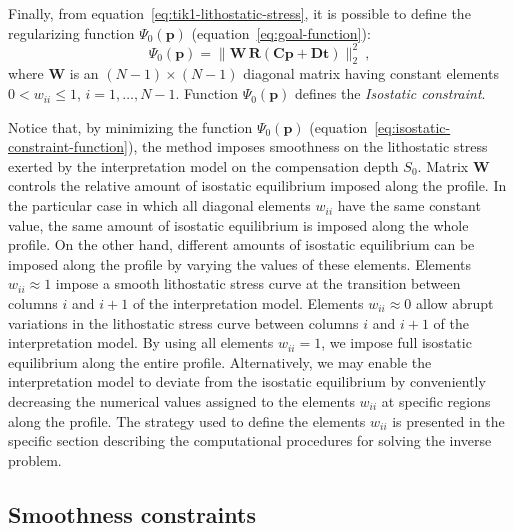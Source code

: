 \documentclass[manuscript,revised]{geophysics}
\begin{document}
Finally, from equation~\ref{eq:tik1-lithostatic-stress}, it is possible to
define the regularizing function $\Psi_{0}(\mathbf{p})$ 
(equation~\ref{eq:goal-function}): 
\begin{equation}
\Psi_{0}(\mathbf{p}) = \| \mathbf{W} \, \mathbf{R} \left( \mathbf{C} \mathbf{p} + \mathbf{D}
\mathbf{t} \right) \|_{2}^{2} \: ,
\label{eq:isostatic-constraint-function}
\end{equation}
where $\mathbf{W}$ is an $(N - 1) \times (N - 1)$ diagonal matrix having constant
elements $0 < w_{ii} \le 1$, $i = 1, \dots, N - 1$. 
Function $\Psi_{0}(\mathbf{p})$ defines the \textit{Isostatic constraint}.

Notice that, by minimizing the function $\Psi_{0}(\mathbf{p})$ 
(equation~\ref{eq:isostatic-constraint-function}), the method imposes smoothness on 
the lithostatic stress exerted by the interpretation model on the 
compensation depth $S_{0}$.
Matrix $\mathbf{W}$ controls the relative amount of isostatic equilibrium imposed 
along the profile. 
In the particular case in which all diagonal elements $w_{ii}$ have the same
constant value, the same amount of isostatic equilibrium is imposed along the 
whole profile. On the other hand, different amounts of isostatic equilibrium
can be imposed along the profile by varying the values of these elements.
Elements $w_{ii} \approx 1$ impose a smooth lithostatic stress curve 
at the transition between columns $i$ and $i+1$ of the interpretation model.
Elements $w_{ii} \approx 0$ allow abrupt variations in the lithostatic stress 
curve between columns $i$ and $i+1$ of the interpretation model.
By using all elements $w_{ii} = 1$, we impose full isostatic equilibrium 
along the entire profile. Alternatively, we may enable the interpretation model 
to deviate from the isostatic equilibrium by conveniently decreasing the numerical values
assigned to the elements $w_{ii}$ at specific regions along the profile. 
The strategy used to define the elements $w_{ii}$ is 
presented in the specific section describing the computational procedures
for solving the inverse problem.


\subsection{Smoothness constraints}
\end{document}
